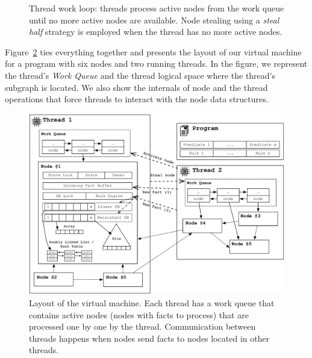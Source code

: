 \begin{figure}
\begin{algorithm}[H]
\end{algorithm}
\caption{Thread work loop: threads process active nodes from the work queue
   until no more active nodes are available. Node stealing using a \emph{steal
      half} strategy is employed when the thread has no more active nodes.}
 \label{alg:thread_work_loop}
\end{figure}

Figure~\ref{fig:implementation:vm_overview} ties everything together and
presents the layout of our virtual machine for a program with six nodes and two
running threads. In the figure, we represent the thread's \emph{Work Queue} and
the thread logical space where the thread's subgraph is located. We also show
the internals of node  and the thread operations that force threads to
interact with the node data structures.

\begin{figure}[t]
\centering
\includegraphics[width=\textwidth]{figures/implementation/vm_overview.pdf}
\caption{Layout of the virtual machine. Each thread has a work queue that
   contains active nodes (nodes with facts to process) that are processed one
   by one by the thread. Communication between threads happens when nodes
   send facts to nodes located in other threads.}
\label{fig:implementation:vm_overview}
\end{figure}


